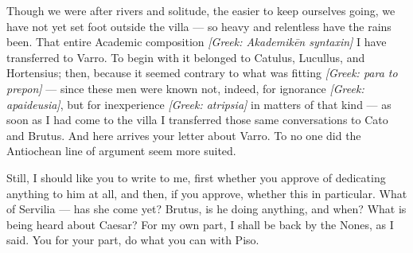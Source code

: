 

 Though we were after rivers and solitude, the easier to keep ourselves going, we have not yet set foot outside the villa --- so heavy and relentless have the rains been. That entire Academic composition \textit{[Greek: Akademik\=en syntaxin]} I have transferred to Varro. To begin with it belonged to Catulus, Lucullus, and Hortensius; then, because it seemed contrary to what was fitting \textit{[Greek: para to prepon]} --- since these men were known not, indeed, for ignorance \textit{[Greek: apaideusia]}, but for inexperience \textit{[Greek: atripsia]} in matters of that kind --- as soon as I had come to the villa I transferred those same conversations to Cato and Brutus. And here arrives your letter about Varro. To no one did the Antiochean line of argument seem more suited.

 Still, I should like you to write to me, first whether you approve of dedicating anything to him at all, and then, if you approve, whether this in particular. What of Servilia --- has she come yet? Brutus, is he doing anything, and when? What is being heard about Caesar? For my own part, I shall be back by the Nones, as I said. You for your part, do what you can with Piso.
